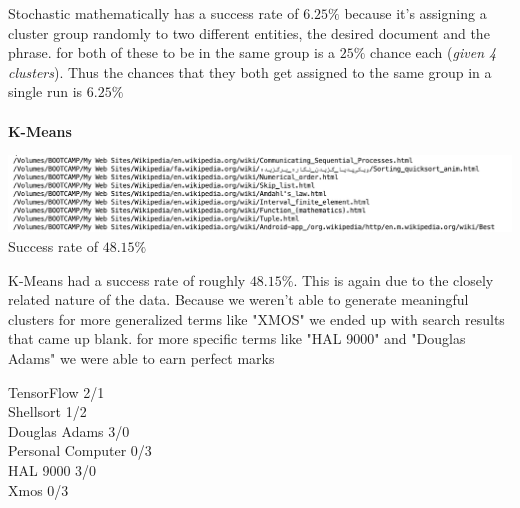 \documentclass{article}
\begin{document}
Stochastic mathematically has a success rate of $6.25\%$ because it's assigning a cluster group randomly to two different entities, the desired document and the phrase. for both of these to be in the same group is a $25\%$ chance each (\textit{given 4 clusters}). Thus the chances that they both get assigned to the same group in a single run is $6.25\%$
\\\\
\noindent
\textbf{K-Means}
\begin{center}
\includegraphics[scale=0.4]{Kmeans.png}\\
Success rate of $48.15\%$
\end{center}
K-Means had a success rate of roughly $48.15\%$. This is again due to the closely related nature of the data. Because we weren't able to generate meaningful clusters for more generalized terms like "XMOS" we ended up with search results that came up blank. for more specific terms like "HAL 9000" and "Douglas Adams" we were able to earn perfect marks

\begin{center}
    TensorFlow 2/1 \\
Shellsort 1/2 \\
Douglas Adams 3/0 \\
Personal Computer 0/3 \\
HAL 9000 3/0 \\
Xmos 0/3 \\
\end{center}
\end{document}
